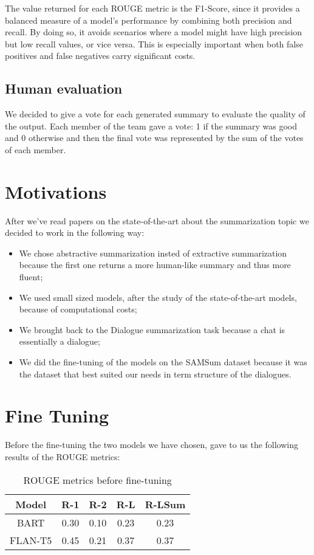 \documentclass[10pt,twocolumn,letterpaper]{article}
\begin{document}
The value returned for each ROUGE metric is the F1-Score, since it provides a balanced measure of a model's performance by combining both precision and recall. By doing so, it avoids scenarios where a model might have high precision but low recall values, or vice versa. This is especially important when both false positives and false negatives carry significant costs.

\subsection{Human evaluation}
We decided to give a vote for each generated summary to evaluate the quality of the output.
Each member of the team gave a vote: 1 if the summary was good and 0 otherwise and then the final vote
was represented by the sum of the votes of each member. 

\section{Motivations}
After we've read papers on the state-of-the-art about the summarization topic we decided to work in 
the following way:
\begin{itemize}
    \item We chose abstractive summarization insted of extractive summarization because the first one 
    returns a more human-like summary and thus more fluent;
    \item We used small sized models, after the study of the state-of-the-art models, because of computational 
    costs;
    \item We brought back to the Dialogue summarization task because a chat is essentially a dialogue;
    \item We did the fine-tuning of the models on the SAMSum dataset because it was the dataset that 
    best suited our needs in term structure of the dialogues.
\end{itemize}

\section{Fine Tuning}
Before the fine-tuning the two models we have chosen, gave to us the following results of the ROUGE metrics:
\begin{table}[h!]
    \centering
    \begin{tabular}{|c|c|c|c|c|}
        \hline
        \rowcolor{lightergray}
        Model & R-1 & R-2 & R-L & R-LSum \\ 
        \hline
        BART & 0.30 & 0.10 & 0.23 & 0.23\\
        FLAN-T5 & 0.45 & 0.21 & 0.37 & 0.37\\
        \hline
    \end{tabular}
    \caption{ROUGE metrics before fine-tuning}
    \label{table:ROUGEbeforeft}
\end{table}
\end{document}

